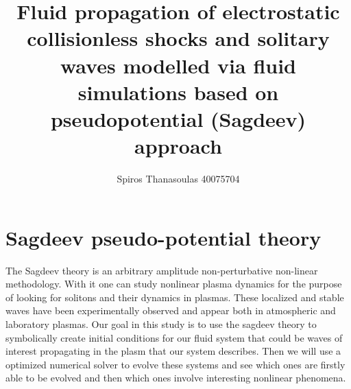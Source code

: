 \documentclass{article}
\begin{document}
\title{Fluid propagation of electrostatic collisionless shocks and solitary waves modelled via fluid simulations based on pseudopotential (Sagdeev) approach}
\author{Spiros Thanasoulas 40075704}
\maketitle
\section{Sagdeev pseudo-potential theory}
The Sagdeev theory is an arbitrary amplitude non-perturbative
non-linear methodology. With it one can study nonlinear 
plasma dynamics for the purpose of looking for solitons and 
their dynamics in plasmas. These localized and stable waves
have been experimentally observed and appear both in atmospheric and laboratory plasmas.
Our goal in this study is to use the sagdeev theory to symbolically create initial conditions
for our fluid system that could be waves of interest propagating in the plasm that our system
describes. Then we will use a optimized numerical solver to evolve these systems and see which ones
are firstly able to be evolved and then which ones involve interesting nonlinear phenomena.
\end{document}

